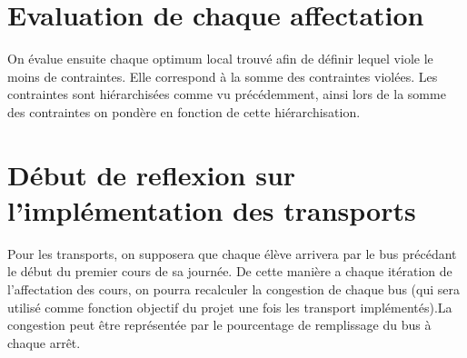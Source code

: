 \documentclass[a4paper,11pt]{article}
\begin{document}
\section{Evaluation de chaque affectation}
	On évalue ensuite chaque optimum local trouvé afin de définir lequel viole le moins de contraintes. Elle correspond à la somme des contraintes violées. Les contraintes sont hiérarchisées comme vu précédemment, ainsi lors de la somme des contraintes on pondère en fonction de cette hiérarchisation.
	
\section{Début de reflexion sur l'implémentation des transports}
	Pour les transports, on supposera que chaque élève arrivera par le bus précédant le début du premier cours de sa journée. De cette manière a chaque itération de l'affectation des cours, on pourra recalculer la congestion de chaque bus (qui sera utilisé comme fonction objectif du projet une fois les transport implémentés).La congestion peut être représentée par le pourcentage de remplissage du bus à chaque arrêt.
\end{document}
